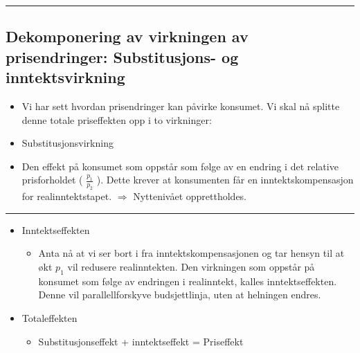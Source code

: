 \documentclass[
  letterpaper,
  DIV=11,
  numbers=noendperiod]{scrartcl}
\providecommand{\tightlist}{%
  \setlength{\itemsep}{0pt}\setlength{\parskip}{0pt}}\usepackage{longtable,booktabs,array}
\begin{document}
\begin{center}\rule{0.5\linewidth}{0.5pt}\end{center}

\subsection{Dekomponering av virkningen av prisendringer: Substitusjons-
og
inntektsvirkning}\label{dekomponering-av-virkningen-av-prisendringer-substitusjons--og-inntektsvirkning}

\begin{itemize}
\tightlist
\item
  Vi har sett hvordan prisendringer kan påvirke konsumet. Vi skal nå
  splitte denne totale priseffekten opp i to virkninger:
\item
  Substitusjonsvirkning
\item
  Den effekt på konsumet som oppstår som følge av en endring i det
  relative prisforholdet ( \(\frac{p_1}{p_2}\) ). Dette krever at
  konsumenten får en inntektskompensasjon for realinntektstapet.
  \(\Rightarrow\) Nyttenivået opprettholdes.
\end{itemize}

\begin{center}\rule{0.5\linewidth}{0.5pt}\end{center}

\begin{itemize}
\tightlist
\item
  Inntektseffekten

  \begin{itemize}
  \tightlist
  \item
    Anta nå at vi ser bort i fra inntektskompensasjonen og tar hensyn
    til at økt \(p_1\) vil redusere realinntekten. Den virkningen som
    oppstår på konsumet som følge av endringen i realinntekt, kalles
    inntektseffekten. Denne vil parallellforskyve budsjettlinja, uten at
    helningen endres.
  \end{itemize}
\item
  Totaleffekten

  \begin{itemize}
  \tightlist
  \item
    Substitusjonseffekt + inntektseffekt = Priseffekt
  \end{itemize}
\end{itemize}
\end{document}
